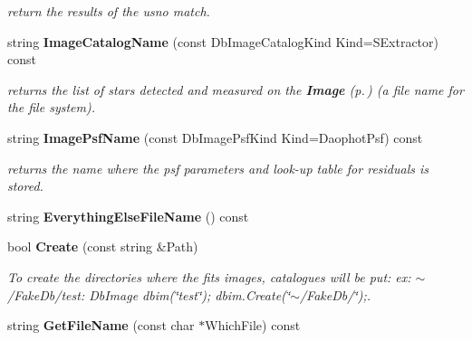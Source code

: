 \begin{CompactItemize}
\begin{CompactList}\small\item\em return the results of the usno match.\item\end{CompactList}\item 
string {\bf Image\-Catalog\-Name} (const Db\-Image\-Catalog\-Kind Kind=SExtractor) const
\begin{CompactList}\small\item\em returns the list of stars detected and measured on the {\bf Image} {\rm (p.\,\pageref{class_image})} (a file name for the file system).\item\end{CompactList}\item 
{}
string {\bf Image\-Psf\-Name} (const Db\-Image\-Psf\-Kind Kind=Daophot\-Psf) const\label{class_dbimage_a25}

\begin{CompactList}\small\item\em returns the name where the psf parameters and look-up table for residuals is stored.\item\end{CompactList}\item 
{}
string {\bf Everything\-Else\-File\-Name} () const\label{class_dbimage_a26}

\item 
{}
bool {\bf Create} (const string \&Path)\label{class_dbimage_a27}

\begin{CompactList}\small\item\em To create the directories where the fits images, catalogues will be put: ex: $\sim$/Fake\-Db/test: Db\-Image dbim(\char`\"{}test\char`\"{}); dbim.Create(\char`\"{}$\sim$/Fake\-Db/\char`\"{});.\item\end{CompactList}\item 
{}
string {\bf Get\-File\-Name} (const char $\ast$Which\-File) const\label{class_dbimage_a28}


\end{CompactItemize}
